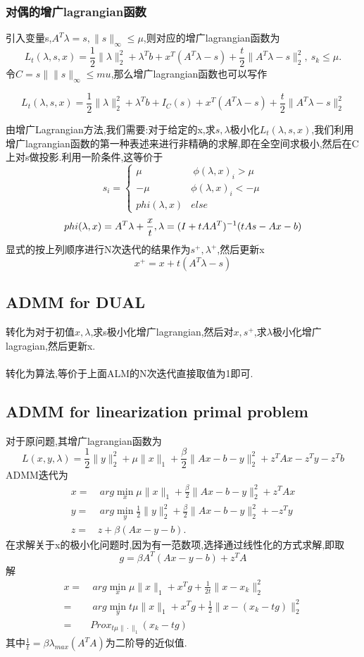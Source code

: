 \documentclass[UTF8]{ctexart}
\begin{document}
\subsubsection{对偶的增广lagrangian函数}
引入变量s,$A^{T}\lambda=s,\|s\|_{\infty}\leq \mu$,则对应的增广lagrangian函数为
$$
L_{t}(\lambda,s,x) = \frac{1}{2}\|\lambda\|_{2}^{2} + \lambda^{T}b + x^{T}(A^{T}\lambda-s)+\frac{t}{2}\|A^{T}\lambda-s\|_{2}^2,\  s_k\leq \mu.
$$
令$C={s\| \|s\|_\infty \leq mu}$,那么增广lagrangian函数也可以写作

$$
L_{t}(\lambda,s,x) = \frac{1}{2}\|\lambda\|_{2}^{2} + \lambda^{T}b + I_C(s) + x^{T}(A^{T}\lambda-s)+\frac{t}{2}\|A^{T}\lambda-s\|_{2}^2
$$

由增广Lagrangian方法,我们需要:对于给定的x,求$s,\lambda$极小化$L_{t}(\lambda ,s,x)$,我们利用增广lagrangian函数的第一种表述来进行非精确的求解,即在全空间求极小,然后在C上对s做投影.利用一阶条件,这等价于
  $$
  s_{i}=\left\{
  \begin{aligned}
   \mu & \  \phi(\lambda,x)_i>\mu \\
    -\mu & \phi(\lambda,x)_i<-\mu \\
    phi(\lambda,x) & else
  \end{aligned}
  \right.
$$
$$
  phi(\lambda,x) = A^T\lambda+\frac{x}{t}, \\
  \lambda = (I+tAA^T)^{-1}(tAs-Ax-b)
  $$
  显式的按上列顺序进行N次迭代的结果作为$s^+,\lambda^+$,然后更新x
  $$
  x^+ = x+t(A^T\lambda-s)
  $$
  \subsection{ADMM for DUAL}
  转化为对于初值$x,\lambda$,求s极小化增广lagrangian,然后对$x,s^+$,求$\lambda$极小化增广lagragian,然后更新x.
  \paragraph{}
  转化为算法,等价于上面ALM的N次迭代直接取值为1即可.

\subsection{ADMM for linearization primal problem}
对于原问题,其增广lagrangian函数为
$$
L(x,y,\lambda)=\frac{1}{2}\|y\|_{2}^{2} + \mu \|x\|_{1}+\frac{\beta}{2}\|Ax-b-y\|_2^2 + z^TAx - z^Ty -z^Tb
$$
ADMM迭代为
  $$
  \begin{aligned}
   x =& \  arg \min\limits_{x} \mu \|x\|_{1}+\frac{\beta}{2}\|Ax-b-y\|_2^2 + z^TAx \\
   y =& \  arg \min\limits_{y} \frac{1}{2}\|y\|_{2}^{2}+\frac{\beta}{2}\|Ax-b-y\|_2^2 + - z^Ty \\
   z =& z+ \beta (Ax-y-b).
  \end{aligned}
$$
在求解关于x的极小化问题时,因为有一范数项,选择通过线性化的方式求解,即取
$$
g=\beta A^T(Ax-y-b) +z^TA
$$
解
$$
  \begin{aligned}
   x =& \  arg \min\limits_{x} \mu \|x\|_{1}+x^Tg + \frac{1}{2t}\|x-x_k\|_2^2 \\
     =& \  arg \min\limits_{y} t\mu \|x\|_{1}+x^Tg + \frac{1}{2}\|x-(x_k-tg)\|_2^2  \\
    =& Prox_{t\mu\|\cdot\|_1}(x_k-tg)
  \end{aligned}
$$
其中$\frac{1}{t}=\beta\lambda_{max}(A^TA) $为二阶导的近似值.
\end{document}

